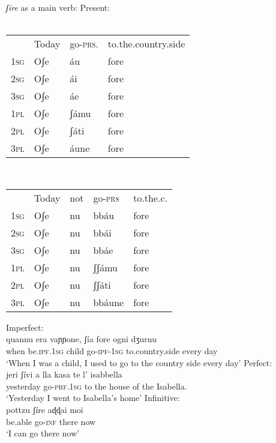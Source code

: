 \documentclass[output=paper]{langscibook}
\begin{document}
\ea \label{ac24}\textit{ʃire} as a main verb:
    \ea \label{ac24a}Present:\\
       \ea\label{ac24ai}~\\
            \begin{table}[htb]
            \begin{tabular}{llll    }
                & Today & go-\textsc{prs}. & to.the.country.side\\
            \textsc{1sg} & Oʃe   & áu      & fore\\
            \textsc{2sg} & Oʃe   & ái      & fore\\
            \textsc{3sg} & Oʃe   & áe      & fore\\
            \textsc{1pl} & Oʃe   & ʃámu    & fore\\
            \textsc{2pl} & Oʃe   & ʃáti    & fore\\
            \textsc{3pl} & Oʃe   & áune    & fore\\
            \end{tabular}
            \end{table}
        \ex\label{ac24aii}~\\
        \begin{table}[htb]
        \begin{tabular}{lllll}
         & Today & not     & go-\textsc{prs}              & to.the.c. \\
        \textsc{1sg} & Oʃe   & nu      & bbáu                & fore      \\
        \textsc{2sg} & Oʃe   & nu      & bbái                & fore      \\
        \textsc{3sg} & Oʃe   & nu      & bbáe                & fore      \\
        \textsc{1pl} & Oʃe   & nu      & ʃʃámu               & fore      \\
        \textsc{2pl} & Oʃe   & nu      & ʃʃáti               & fore      \\
        \textsc{3pl} & Oʃe   & nu      & bbáune              & fore     
        \end{tabular}
        \end{table}
        \z  
    \ex \label{ac24b}Imperfect:\\
    \gll      quannu era    vaɲɲone, ʃía      fore    ogni dʒurnu\\
     when be.\textsc{ipf}.\textsc{1sg} child  go-\textsc{ipf}-\textsc{1sg} to.country.side every day\\
     \glt ‘When I was a child, I used to go to the country side every day’
    \ex  \label{ac24c}Perfect: \\
    \gll jeri      ʃívi      a lla  kasa   te l’ isabbella\\
     yesterday  go-\textsc{prf}.\textsc{1sg} to the house of the Isabella.\\
    \glt ‘Yesterday I went to Isabella’s home’
    \ex \label{ac24d}Infinitive: \\
     \gll pottzu  ʃíre    aɖɖai  moi\\
     be.able go-\textsc{inf}  there now\\
     \glt ‘I can go there now’
    \z
\z
\end{document}

